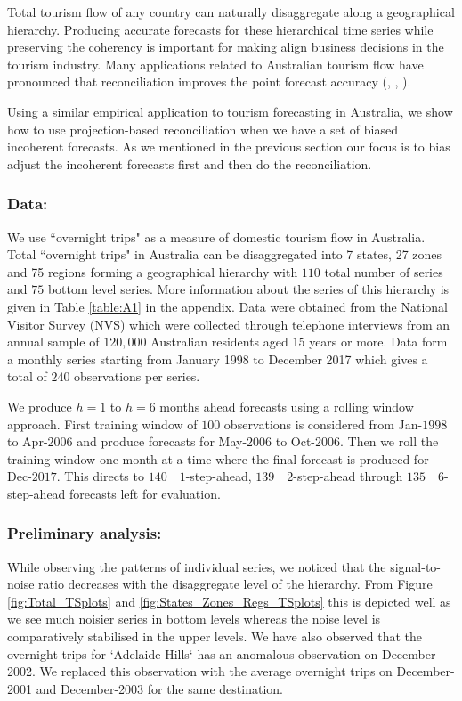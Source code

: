 \documentclass[12pt]{article}
\theoremstyle{definition}
\theoremstyle{property}
\begin{document}
	Total tourism flow of any country can naturally disaggregate along a geographical hierarchy. Producing accurate forecasts for these hierarchical time series while preserving the coherency is important for making align business decisions in the tourism industry. Many applications related to Australian tourism flow have pronounced that reconciliation improves the point forecast accuracy (\cite{Athanasopoulos2009}, \cite{Hyndman2011}, \cite{WicEtAl2019}). 
	
	Using a similar empirical application to tourism forecasting in Australia, we show how to use projection-based reconciliation when we have a set of biased incoherent forecasts. As we mentioned in the previous section our focus is to bias adjust the incoherent forecasts first and then do the reconciliation. 
	
	\subsubsection*{Data:}
	We use ``overnight trips" as a measure of domestic tourism flow in Australia. Total ``overnight trips" in Australia can be disaggregated into 7 states, 27 zones and 75 regions forming a geographical hierarchy with $110$ total number of series and $75$ bottom level series. More information about the series of this hierarchy is given in Table \ref{table:A1} in the appendix. Data were obtained from the National Visitor Survey (NVS) which were collected through telephone interviews from an annual sample of $120,000$ Australian residents aged $15$ years or more. Data form a monthly series starting from January 1998 to December 2017 which gives a total of $240$ observations per series. 
	
	We produce $h=1$ to $h=6$ months ahead forecasts using a rolling window approach. First training window of $100$ observations is considered from Jan-$1998$ to Apr-$2006$ and produce forecasts for May-$2006$ to Oct-$2006$. Then we roll the training window one month at a time where the final forecast is produced for Dec-$2017$. This directs to $140 \quad 1$-step-ahead, $139 \quad 2$-step-ahead through $135 \quad 6$-step-ahead forecasts left for evaluation. 
	
	
	\subsubsection*{Preliminary analysis:}
		
	While observing the patterns of individual series, we noticed that the signal-to-noise ratio decreases with the disaggregate level of the hierarchy. From Figure \ref{fig:Total_TSplots} and \ref{fig:States_Zones_Regs_TSplots} this is depicted well as we see much noisier series in bottom levels whereas the noise level is comparatively stabilised in the upper levels. We have also observed that the overnight trips for `Adelaide Hills` has an anomalous observation on December-2002. We replaced this observation with the average overnight trips on December-2001 and December-2003 for the same destination.
	
\end{document}
